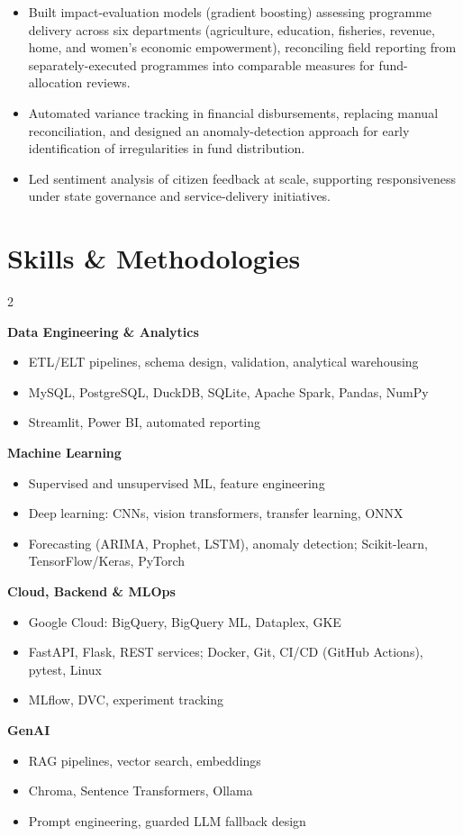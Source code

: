 \documentclass[a4paper,10pt]{article}
\begin{document}
\begin{itemize}
\item Built impact-evaluation models (gradient boosting) assessing programme delivery across six departments (agriculture, education, fisheries, revenue, home, and women's economic empowerment), reconciling field reporting from separately-executed programmes into comparable measures for fund-allocation reviews.
\item Automated variance tracking in financial disbursements, replacing manual reconciliation, and designed an anomaly-detection approach for early identification of irregularities in fund distribution.
\item Led sentiment analysis of citizen feedback at scale, supporting responsiveness under state governance and service-delivery initiatives.
\end{itemize}

\section*{Skills \& Methodologies}

\begin{multicols}{2}
\raggedright

\textbf{Data Engineering \& Analytics}
\begin{itemize}
\item ETL/ELT pipelines, schema design, validation, analytical warehousing
\item MySQL, PostgreSQL, DuckDB, SQLite, Apache Spark, Pandas, NumPy
\item Streamlit, Power BI, automated reporting
\end{itemize}

\textbf{Machine Learning}
\begin{itemize}
\item Supervised and unsupervised ML, feature engineering
\item Deep learning: CNNs, vision transformers, transfer learning, ONNX
\item Forecasting (ARIMA, Prophet, LSTM), anomaly detection; Scikit-learn, TensorFlow/Keras, PyTorch
\end{itemize}

\columnbreak

\textbf{Cloud, Backend \& MLOps}
\begin{itemize}
\item Google Cloud: BigQuery, BigQuery ML, Dataplex, GKE
\item FastAPI, Flask, REST services; Docker, Git, CI/CD (GitHub Actions), pytest, Linux
\item MLflow, DVC, experiment tracking
\end{itemize}

\textbf{GenAI}
\begin{itemize}
\item RAG pipelines, vector search, embeddings
\item Chroma, Sentence Transformers, Ollama
\item Prompt engineering, guarded LLM fallback design
\end{itemize}

\end{multicols}
\end{document}
